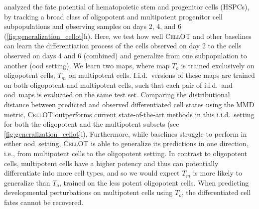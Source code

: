 \citet{weinreb2020lineage} analyzed the fate potential of hematopoietic stem and progenitor cells (HSPCs), by tracking a broad class of oligopotent %
and multipotent %
 progenitor cell subpopulations and observing samples on days 2, 4, and 6 (\cref{fig:generalization_cellot}h).
Here, we test how well \textsc{CellOT} and other baselines can learn the differentiation process of the cells observed on day 2 to the cells observed on days 4 and 6 (combined) and generalize from one subpopulation to another (\acrshort{ood} setting).
We learn two maps, where map $T_o$ is trained exclusively on oligopotent cells, $T_m$ on multipotent cells.
I.i.d.~versions of these maps are trained on both oligopotent and multipotent cells, such that each pair of i.i.d.~and \acrshort{ood}~maps is evaluated on the same test set.
Comparing the distributional distance between predicted and observed differentiated cell states using the \acrshort{MMD} metric, \textsc{CellOT} outperforms current state-of-the-art methods in this i.i.d.~setting for both the oligopotent and the multipotent subsets (see \cref{fig:generalization_cellot}i).
Furthermore, while baselines struggle to perform in either \acrshort{ood}~setting, \textsc{CellOT} is able to generalize its predictions in one direction, i.e., from multipotent cells to the oligopotent setting.
In contrast to oligopotent cells, multipotent cells have a higher potency and thus can potentially differentiate into more cell types, and so we would expect $T_m$ is more likely to generalize than $T_o$, trained on the less potent oligopotent cells.
When predicting developmental perturbations on multipotent cells using $T_o$, the differentiated cell fates cannot be recovered.

